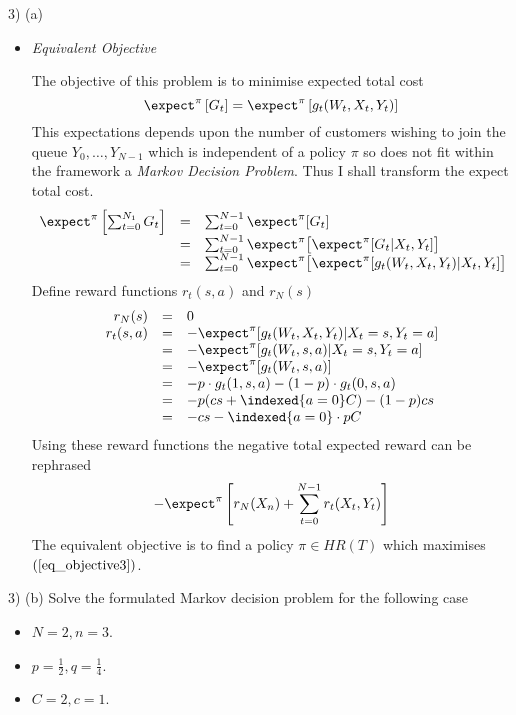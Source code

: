 \documentclass[11pt,a4paper]{article}
\begin{document}
\begin{answer}{3) (a)}
\begin{itemize}
    \item \textit{Equivalent Objective}
    \par The objective of this problem is to minimise expected total cost
    \[ \expect^\pi\left[G_t\right]=\expect^\pi\left[g_t(W_t,X_t,Y_t)\right] \]
    This expectations depends upon the number of customers wishing to join the queue $Y_0,\dots,Y_{N-1}$ which is independent of a policy $\pi$ so does not fit within the framework a \textit{Markov Decision Problem}. Thus I shall transform the expect total cost.
    \[\begin{array}{rcl}
      \expect^\pi\left[\sum_{t=0}^{N_1}G_t\right]&=&\sum_{t=0}^{N-1}\expect^\pi[G_t]\\
      &=&\sum_{t=0}^{N-1}\expect^\pi\big[\expect^\pi[G_t|X_t,Y_t]\big]\\
      &=&\sum_{t=0}^{N-1}\expect^\pi\big[\expect^\pi[g_t(W_t,X_t,Y_t)|X_t,Y_t]\big]\\
    \end{array}\]
    Define reward functions $r_t(s,a)$ and $r_N(s)$
    \[\begin{array}{rcl}
      r_N(s)&=&0\\
      r_t(s,a)&=&-\expect^\pi[g_t(W_t,X_t,Y_t)|X_t=s,Y_t=a]\\
      &=&-\expect^\pi[g_t(W_t,s,a)|X_t=s,Y_t=a]\\
      &=&-\expect^\pi[g_t(W_t,s,a)]\\
      &=&-p\cdot g_t(1,s,a)-(1-p)\cdot g_t(0,s,a)\\
      &=&-p(cs+\indexed\{a=0\}C)-(1-p)cs\\
      &=&-cs-\indexed\{a=0\}\cdot pC
    \end{array}\]
    Using these reward functions the negative total expected reward can be rephrased
    \begin{equation} \label{eq_objective3}
      -\expect^\pi\left[r_N(X_n)+\sum_{t=0}^{N-1}r_t(X_t,Y_t)\right]
    \end{equation}
    The equivalent objective is to find a policy $\pi\in HR(T)$ which maximises $(\ref{eq_objective3})$.
  \end{itemize}
\end{answer}

\begin{question}{3) (b)}
  Solve the formulated Markov decision problem for the following case
  \begin{itemize}
    \item $N=2,n=3$.
    \item $p=\frac12,q=\frac14$.
    \item $C=2,c=1$.
  \end{itemize}
\end{question}
\end{document}

